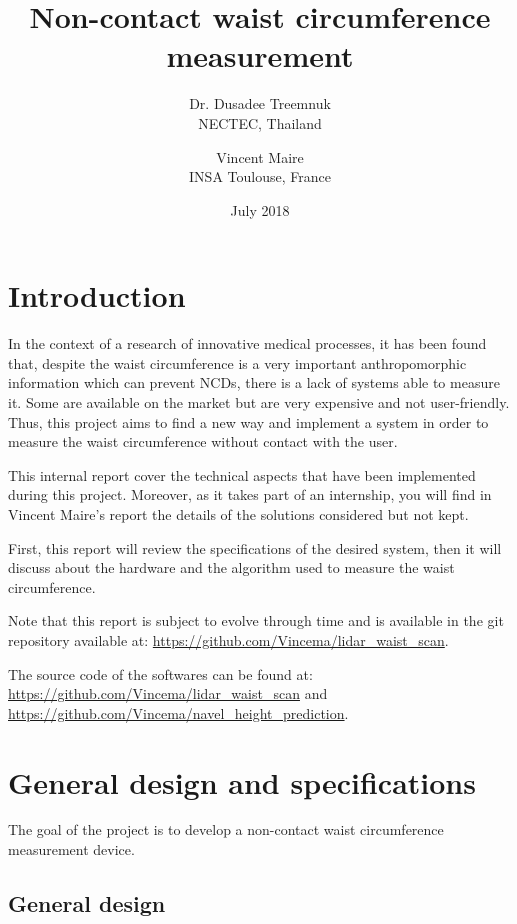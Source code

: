 \documentclass{article}
\title{Non-contact waist circumference measurement}
\author{ Dr. Dusadee Treemnuk \\
         NECTEC, Thailand
         \and
         Vincent Maire\\
         INSA Toulouse, France }
\date{July 2018}
\newcommand{\vsp}{\vspace{\baselineskip}}
\begin{document}
\maketitle

\section*{Introduction}

In the context of a research of innovative medical processes, it has been found that, despite the waist circumference is a very important anthropomorphic information which can prevent NCDs, there is a lack of systems able to measure it. Some are available on the market but are very expensive and not user-friendly. Thus, this project aims to find a new way and implement a system in order to measure the waist circumference without contact with the user. 

\vsp

This internal report cover the technical aspects that have been implemented during this project. Moreover, as it takes part of an internship, you will find in Vincent Maire's report \cite{MAIRE_internship_report} the details of the solutions considered but not kept.  

\vsp

First, this report will review the specifications of the desired system, then it will discuss about the hardware and the algorithm used to measure the waist circumference.

\vsp

Note that this report is subject to evolve through time and is available in the git repository available at: \url{https://github.com/Vincema/lidar_waist_scan}. 

\vsp

The source code of the softwares can be found at: \url{https://github.com/Vincema/lidar_waist_scan}
and 
\url{https://github.com/Vincema/navel_height_prediction}.

\newpage
\tableofcontents
\newpage

\section{General design and specifications}

The goal of the project is to develop a non-contact waist circumference measurement device.

\subsection{General design} \label{sec:general_design}
\end{document}
